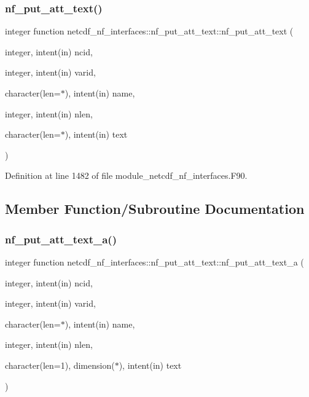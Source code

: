 \subsubsection{\texorpdfstring{nf\+\_\+put\+\_\+att\+\_\+text()}{nf\_put\_att\_text()}}
{\footnotesize\ttfamily integer function netcdf\+\_\+nf\+\_\+interfaces\+::nf\+\_\+put\+\_\+att\+\_\+text\+::nf\+\_\+put\+\_\+att\+\_\+text (\begin{DoxyParamCaption}\item[{integer, intent(in)}]{ncid,  }\item[{integer, intent(in)}]{varid,  }\item[{character(len=$\ast$), intent(in)}]{name,  }\item[{integer, intent(in)}]{nlen,  }\item[{character(len=$\ast$), intent(in)}]{text }\end{DoxyParamCaption})}



Definition at line 1482 of file module\+\_\+netcdf\+\_\+nf\+\_\+interfaces.\+F90.



\subsection{Member Function/\+Subroutine Documentation}
\mbox{\label{interfacenetcdf__nf__interfaces_1_1nf__put__att__text_a22fb68c628bc4e70b10375d2f5462521}} 
\subsubsection{\texorpdfstring{nf\+\_\+put\+\_\+att\+\_\+text\+\_\+a()}{nf\_put\_att\_text\_a()}}
{\footnotesize\ttfamily integer function netcdf\+\_\+nf\+\_\+interfaces\+::nf\+\_\+put\+\_\+att\+\_\+text\+::nf\+\_\+put\+\_\+att\+\_\+text\+\_\+a (\begin{DoxyParamCaption}\item[{integer, intent(in)}]{ncid,  }\item[{integer, intent(in)}]{varid,  }\item[{character(len=$\ast$), intent(in)}]{name,  }\item[{integer, intent(in)}]{nlen,  }\item[{character(len=1), dimension($\ast$), intent(in)}]{text }\end{DoxyParamCaption})}



